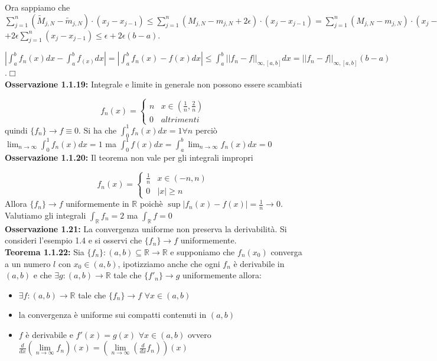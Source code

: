 \documentclass[a4paper,11pt,titlepage]{book}
\begin{document}
Ora sappiamo che 
 $\sum_{j=1}^n (\widetilde{M}_{j,N}-\widetilde{m}_{j,N}) \cdot (x_{j}-x_{j-1})\leq \sum_{j=1}^n (M_{j,N}-m_{j,N}+2\epsilon)\cdot (x_{j}-x_{j-1})=\sum_{j=1}^n (M_{j,N}-m_{j,N})\cdot (x_{j}-x_{j-1})$ $+2\epsilon\sum_{j=1}^n(x_{j}-x_{j-1})\leq \epsilon +2\epsilon(b-a)$.

$|\int_{a}^{b}f_{n}(x)dx-\int_{a}^{b}f_(x)dx|=|\int_{a}^{b}f_{n}(x)-f(x)dx|\leq\int_{a}^{b}||f_{n}-f||_{\infty,[a,b]}dx=||f_{n}-f||_{\infty,[a,b]}(b-a)$ .$\Box$\\

\textbf{Osservazione 1.1.19:} Integrale e limite in generale non possono essere scambiati

$$f_{n}(x)=\begin{cases} n &  x\in (\frac{1}{n},\frac{2}{n}) \\ 0 & altrimenti \end{cases}$$ quindi $\{f_{n}\}\rightarrow f\equiv 0$. Si ha che $\int_{0}^{1}f_{n}(x)dx=1 \forall{n}$ perciò $ \lim_{n \to \infty}\int_{0}^{1}f_{n}(x)dx=1$ ma $\int_{0}^{1}f(x)dx=\int_{a}^{b}\lim_{n \to \infty}{f_{n}(x)}dx=0$ \\

\textbf{Osservazione 1.1.20:} Il teorema non vale per gli integrali impropri

$$f_{n}(x)=\begin{cases} \frac{1}{n} &  x\in (-n,n) \\ 0 & |x|\geq n \end{cases}$$ Allora $\{f_{n}\}\rightarrow f$ uniformemente in $\mathbb{R}$ poichè $\sup |f_{n}(x)-f(x)|=\frac{1}{n} \rightarrow 0$. Valutiamo gli integrali $\int_{ \mathbb{R} }^{}f_{n}=2$ ma $\int_{\mathbb{R}}^{}f=0$\\

\textbf{Osservazione 1.21:} La convergenza uniforme non preserva la derivabilità. Si consideri l'esempio 1.4 e si osservi che  $\{f_{n}\}\rightarrow f$ uniformemente.\\

\textbf{Teorema 1.1.22:} Sia $\{f_{n}\}:(a,b)\subseteq \mathbb{R} \rightarrow\mathbb{R}$ e supponiamo che $f_{n}(x_0)$ converga a un numero $l$ con $x_0\in (a,b)$, ipotizziamo anche che ogni $f_{n}$ è derivabile in $(a,b)$  e che $\exists g:(a,b)\rightarrow\mathbb{R}$ tale che $\{f'_{n}\}\rightarrow g$ uniformemente allora:\begin{itemize}
\item $\exists f:(a,b)\rightarrow\mathbb{R}$ tale che $\{f_{n}\}\rightarrow f$ $\forall{x}\in (a,b)$
\item la convergenza è uniforme sui compatti contenuti in $(a,b)$
\item $f$ è derivabile e $f'(x)=g(x)$ $\forall{x}\in (a,b)$ ovvero $\frac{d}{dx}(\lim\limits_{n \to \infty}f_{n})(x)=(\lim\limits_{n \to \infty}(\frac{d}{dx}f_{n}))(x)$\\
\end{itemize}
\end{document}
